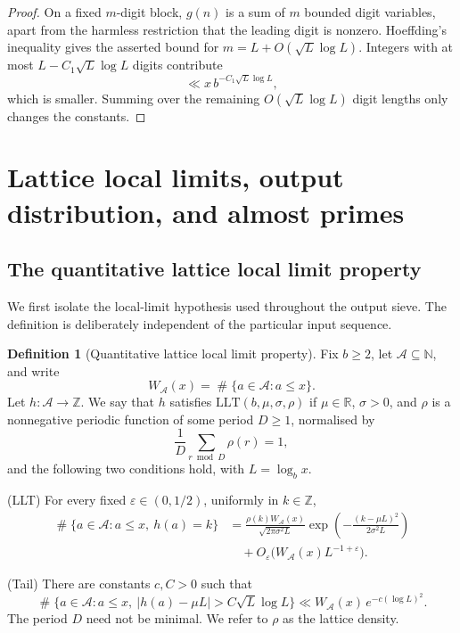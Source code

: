 \documentclass[11pt,reqno]{amsart}
\theoremstyle{plain}
\theoremstyle{definition}
\newtheorem{definition}[theorem]{Definition}
\newcommand{\N}{\mathbb{N}}
\newcommand{\Z}{\mathbb{Z}}
\newcommand{\R}{\mathbb{R}}
\newcommand{\eps}{\varepsilon}
\newcommand{\1}{\mathbf 1}
\DeclareMathOperator{\Card}{\#}
\begin{document}
\begin{proof}
On a fixed $m$-digit block, $g(n)$ is a sum of $m$ bounded digit variables, apart from the harmless restriction that the leading digit is nonzero.  Hoeffding's inequality \cite{hoeffding} gives the asserted bound for $m=L+O(\sqrt L\log L)$.  Integers with at most $L-C_1\sqrt L\log L$ digits contribute
\[
 \ll x\, b^{-C_1\sqrt L\log L},
\]
which is smaller.  Summing over the remaining $O(\sqrt L\log L)$ digit lengths only changes the constants.
\end{proof}

\section{Lattice local limits, output distribution, and almost primes}\label{sec:sieve}

\subsection{The quantitative lattice local limit property}
We first isolate the local-limit hypothesis used throughout the output sieve.  The definition is deliberately independent of the particular input sequence.

\begin{definition}[Quantitative lattice local limit property]\label{def:qllt}
Fix $b\ge2$, let $\mathcal A\subseteq\N$, and write
\[
 W_{\mathcal A}(x)=\Card\{a\in\mathcal A:a\le x\}.
\]
Let $h:\mathcal A\to\Z$.  We say that $h$ satisfies
\emph{$\mathrm{LLT}(b,\mu,\sigma,\rho)$} if $\mu\in\R$, $\sigma>0$, and $\rho$ is a nonnegative periodic function of some period $D\ge1$, normalised by
\begin{equation}\label{eq:rho-normalization}
 \frac1D\sum_{r\bmod D}\rho(r)=1,
\end{equation}
and the following two conditions hold, with $L=\log_bx$.

\smallskip
\noindent
\textup{(LLT)} For every fixed $\eps\in(0,1/2)$, uniformly in $k\in\Z$,
\begin{equation}\label{eq:abstract-llt}
\begin{split}
 \Card\{a\in\mathcal A:a\le x,\ h(a)=k\}
 &=\frac{\rho(k)W_{\mathcal A}(x)}{\sqrt{2\pi\sigma^2L}}
 \exp\!\left(-\frac{(k-\mu L)^2}{2\sigma^2L}\right)\\
 &\quad+O_\eps\bigl(W_{\mathcal A}(x)L^{-1+\eps}\bigr).
\end{split}
\end{equation}

\smallskip
\noindent
\textup{(Tail)} There are constants $c,C>0$ such that
\begin{equation}\label{eq:abstract-tail}
 \Card\{a\in\mathcal A:a\le x,\ |h(a)-\mu L|>C\sqrt L\log L\}
 \ll W_{\mathcal A}(x)\,e^{-c(\log L)^2}.
\end{equation}
The period $D$ need not be minimal.  We refer to $\rho$ as the lattice density.
\end{definition}
\end{document}
